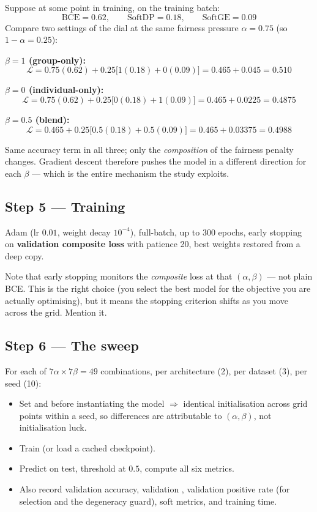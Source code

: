 \begin{example}
Suppose at some point in training, on the training batch:
\[
\mathrm{BCE} = 0.62, \qquad \mathrm{SoftDP} = 0.18, \qquad \mathrm{SoftGE} = 0.09
\]
Compare two settings of the dial at the same fairness pressure
$\alpha = 0.75$ (so $1-\alpha = 0.25$):

\medskip
\textbf{$\beta = 1$ (group-only):}
\[
\mathcal{L} = 0.75(0.62) + 0.25\big[1(0.18) + 0(0.09)\big]
            = 0.465 + 0.045 = \mathbf{0.510}
\]

\textbf{$\beta = 0$ (individual-only):}
\[
\mathcal{L} = 0.75(0.62) + 0.25\big[0(0.18) + 1(0.09)\big]
            = 0.465 + 0.0225 = \mathbf{0.4875}
\]

\textbf{$\beta = 0.5$ (blend):}
\[
\mathcal{L} = 0.465 + 0.25\big[0.5(0.18) + 0.5(0.09)\big]
            = 0.465 + 0.03375 = \mathbf{0.4988}
\]

Same accuracy term in all three; only the \emph{composition} of the fairness
penalty changes. Gradient descent therefore pushes the model in a different
direction for each $\beta$ --- which is the entire mechanism the study
exploits.
\end{example}

\subsection{Step 5 --- Training}

Adam (lr $0.01$, weight decay $10^{-4}$), full-batch, up to 300 epochs, early
stopping on \textbf{validation composite loss} with patience 20, best weights
restored from a deep copy.

Note that early stopping monitors the \emph{composite} loss at that
$(\alpha,\beta)$ --- not plain BCE. This is the right choice (you select the best
model for the objective you are actually optimising), but it means the stopping
criterion shifts as you move across the grid. Mention it.

\subsection{Step 6 --- The sweep}

For each of $7\alpha \times 7\beta = 49$ combinations, per architecture (2), per
dataset (3), per seed (10):

\begin{itemize}
\item Set  and 
before instantiating the model $\Rightarrow$ identical initialisation across
grid points within a seed, so differences are attributable to $(\alpha,\beta)$,
not initialisation luck.
\item Train (or load a cached checkpoint).
\item Predict on test, threshold at $0.5$, compute all six metrics.
\item Also record validation accuracy, validation \dpdtwo{}, validation positive
rate (for selection and the degeneracy guard), soft metrics, and training time.
\end{itemize}


